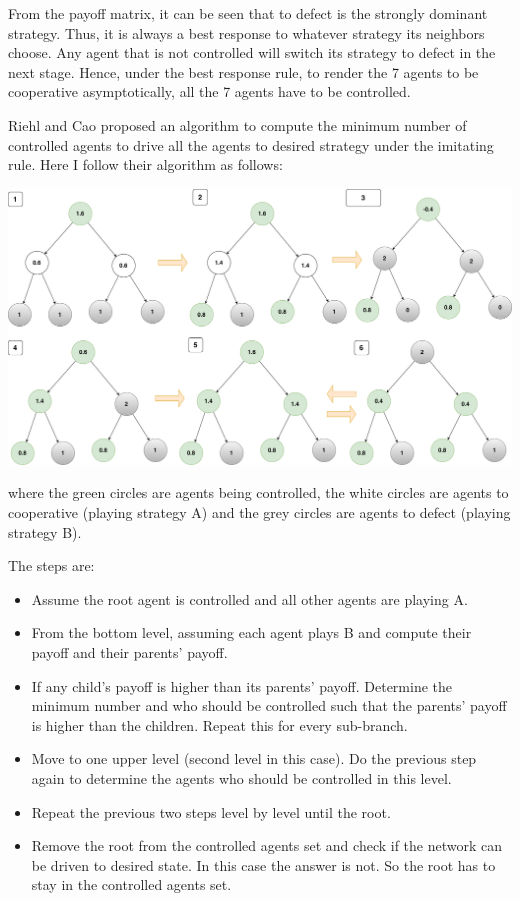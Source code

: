 \documentclass[a4 paper, 12pt]{article}
\begin{document}

 From the payoff matrix, it can be seen that to defect is the strongly dominant strategy. Thus, it is always a best response to whatever strategy its neighbors choose. Any agent that is not controlled will switch its strategy to defect in the next stage. Hence, under the best response rule, to render the 7 agents to be cooperative asymptotically, all the 7 agents have to be controlled. 

 Riehl and Cao \cite{b4} proposed an algorithm to compute the minimum number of controlled agents to drive all the agents to desired strategy under the imitating rule. Here I follow their algorithm as follows:
\begin{center}
        \includegraphics[width = 1.0\textwidth]{network_control.pdf}
\end{center}
where the green circles are agents being controlled, the white circles are agents to cooperative (playing strategy A) and the grey circles are agents to defect (playing strategy B). 

The steps are:
\begin{itemize}
        \item Assume the root agent is controlled and all other agents are playing A.
        \item From the bottom level, assuming each agent plays B and compute their payoff and their parents' payoff. 
        \item If any child's payoff is higher than its parents' payoff. Determine the minimum number and who should be controlled such that the parents' payoff is higher than the children. Repeat this for every sub-branch.
        \item Move to one upper level (second level in this case). Do the previous step again to determine the agents who should be controlled in this level.
        \item Repeat the previous two steps level by level until the root.
        \item Remove the root from the controlled agents set and check if the network can be driven to desired state. In this case the answer is not. So the root has to stay in the controlled agents set.
\end{itemize}
\end{document}
